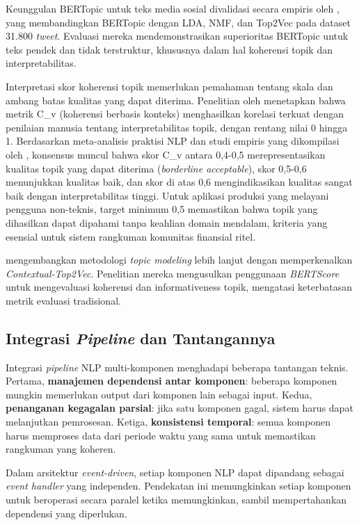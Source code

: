 Keunggulan BERTopic untuk teks media sosial divalidasi secara empiris oleh \textcite{egger2022}, yang membandingkan BERTopic dengan LDA, NMF, dan Top2Vec pada dataset 31.800 \textit{tweet}. Evaluasi mereka mendemonstrasikan superioritas BERTopic untuk teks pendek dan tidak terstruktur, khususnya dalam hal koherensi topik dan interpretabilitas.

Interpretasi skor koherensi topik memerlukan pemahaman tentang skala dan ambang batas kualitas yang dapat diterima. Penelitian oleh \textcite{roeder2015} menetapkan bahwa metrik C\_v (koherensi berbasis konteks) menghasilkan korelasi terkuat dengan penilaian manusia tentang interpretabilitas topik, dengan rentang nilai 0 hingga 1. Berdasarkan meta-analisis praktisi NLP dan studi empiris yang dikompilasi oleh \textcite{hoyle2021}, konsensus muncul bahwa skor C\_v antara 0,4-0,5 merepresentasikan kualitas topik yang dapat diterima (\textit{borderline acceptable}), skor 0,5-0,6 menunjukkan kualitas baik, dan skor di atas 0,6 mengindikasikan kualitas sangat baik dengan interpretabilitas tinggi. Untuk aplikasi produksi yang melayani pengguna non-teknis, target minimum 0,5 memastikan bahwa topik yang dihasilkan dapat dipahami tanpa keahlian domain mendalam, kriteria yang esensial untuk sistem rangkuman komunitas finansial ritel.

\textcite{angelov2024} mengembangkan metodologi \textit{topic modeling} lebih lanjut dengan memperkenalkan \textit{Contextual-Top2Vec}. Penelitian mereka mengusulkan penggunaan \textit{BERTScore} untuk mengevaluasi koherensi dan informativeness topik, mengatasi keterbatasan metrik evaluasi tradisional.

\subsection{Integrasi \textit{Pipeline} dan Tantangannya}

Integrasi \textit{pipeline} NLP multi-komponen menghadapi beberapa tantangan teknis. Pertama, \textbf{manajemen dependensi antar komponen}: beberapa komponen mungkin memerlukan output dari komponen lain sebagai input. Kedua, \textbf{penanganan kegagalan parsial}: jika satu komponen gagal, sistem harus dapat melanjutkan pemrosesan. Ketiga, \textbf{konsistensi temporal}: semua komponen harus memproses data dari periode waktu yang sama untuk memastikan rangkuman yang koheren.

Dalam arsitektur \textit{event-driven}, setiap komponen NLP dapat dipandang sebagai \textit{event handler} yang independen. Pendekatan ini memungkinkan setiap komponen untuk beroperasi secara paralel ketika memungkinkan, sambil mempertahankan dependensi yang diperlukan.

